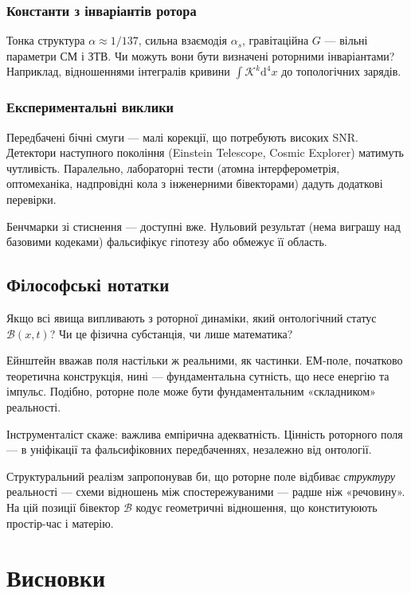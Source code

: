 \documentclass[11pt,a4paper]{article}
\newcommand{\Biv}{\mathcal{B}}
\theoremstyle{definition}
\theoremstyle{plain}
\theoremstyle{remark}
\begin{document}
\subsubsection{Константи з інваріантів ротора}

Тонка структура $\alpha \approx 1/137$, сильна взаємодія $\alpha_s$, гравітаційна $G$ — вільні параметри СМ і ЗТВ. Чи можуть вони бути визначені роторними інваріантами? Наприклад, відношеннями інтегралів кривини $\int \mathcal{K}^k \mathrm{d}^4x$ до топологічних зарядів.

\subsubsection{Експериментальні виклики}

Передбачені бічні смуги — малі корекції, що потребують високих SNR. Детектори наступного покоління (Einstein Telescope, Cosmic Explorer) матимуть чутливість. Паралельно, лабораторні тести (атомна інтерферометрія, оптомеханіка, надпровідні кола з інженерними бівекторами) дадуть додаткові перевірки.

Бенчмарки зі стиснення — доступні вже. Нульовий результат (нема виграшу над базовими кодеками) фальсифікує гіпотезу або обмежує її область.

\subsection{Філософські нотатки}

Якщо всі явища випливають з роторної динаміки, який онтологічний статус $\Biv(x,t)$? Чи це фізична субстанція, чи лише математика?

Ейнштейн вважав поля настільки ж реальними, як частинки. ЕМ-поле, початково теоретична конструкція, нині — фундаментальна сутність, що несе енергію та імпульс. Подібно, роторне поле може бути фундаментальним «складником» реальності.

Інструменталіст скаже: важлива емпірична адекватність. Цінність роторного поля — в уніфікації та фальсифіковних передбаченнях, незалежно від онтології.

Структуральний реалізм запропонував би, що роторне поле відбиває \emph{структуру} реальності — схеми відношень між спостережуваними — радше ніж «речовину». На цій позиції бівектор $\Biv$ кодує геометричні відношення, що конституюють простір-час і матерію.

\vspace{1em}

\section{Висновки}\label{sec:conclusion}
\end{document}
